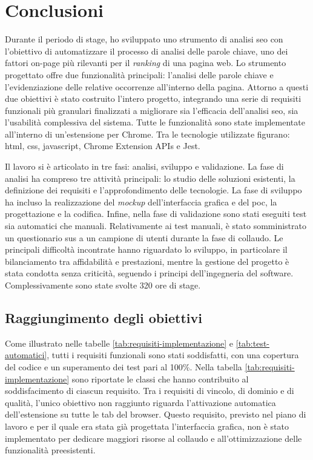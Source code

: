 \chapter{Conclusioni}
\label{cap:conclusioni}

\par Durante il periodo di stage, ho sviluppato uno strumento di analisi \gls{seo} con l’obiettivo di automatizzare il processo di analisi delle parole chiave, uno dei fattori \gls{on-page} più rilevanti per il \textit{ranking} di una pagina web. Lo strumento progettato offre due funzionalità principali: l’analisi delle parole chiave e l’evidenziazione delle relative occorrenze all’interno della pagina. Attorno a questi due obiettivi è stato costruito l’intero progetto, integrando una serie di requisiti funzionali più granulari finalizzati a migliorare sia l’efficacia dell’analisi \gls{seo}, sia l’usabilità complessiva del sistema. Tutte le funzionalità sono state implementate all’interno di un’estensione per Chrome. Tra le tecnologie utilizzate figurano: \gls{html}, \gls{css}, \gls{javascript}, Chrome Extension APIs e Jest.

\vspace{10pt}
\par\noindent Il lavoro si è articolato in tre fasi: analisi, sviluppo e validazione. La fase di analisi ha compreso tre attività principali: lo studio delle soluzioni esistenti, la definizione dei \gls{requisiti} e l’approfondimento delle tecnologie. La fase di sviluppo ha incluso la realizzazione del \textit{mockup} dell'interfaccia grafica e del \gls{poc}, la progettazione e la codifica. Infine, nella fase di validazione sono stati eseguiti test sia automatici che manuali. Relativamente ai test manuali, è stato somministrato un questionario \gls{sus} a un campione di utenti durante la fase di collaudo. Le principali difficoltà incontrate hanno riguardato lo sviluppo, in particolare il bilanciamento tra affidabilità e prestazioni, mentre la gestione del progetto è stata condotta senza criticità, seguendo i principi dell’ingegneria del software. Complessivamente sono state svolte 320 ore di stage.

\section{Raggiungimento degli obiettivi}

\par Come illustrato nelle tabelle \ref{tab:requisiti-implementazione} e \ref{tab:test-automatici}, tutti i \gls{requisiti} funzionali sono stati soddisfatti, con una copertura del codice e un superamento dei test pari al 100\%. Nella tabella \ref{tab:requisiti-implementazione} sono riportate le classi che hanno contribuito al soddisfacimento di ciascun requisito. Tra i \gls{requisiti} di vincolo, di dominio e di qualità, l’unico obiettivo non raggiunto riguarda l’attivazione automatica dell’estensione su tutte le tab del browser. Questo requisito, previsto nel piano di lavoro e per il quale era stata già progettata l’interfaccia grafica, non è stato implementato per dedicare maggiori risorse al collaudo e all’ottimizzazione delle funzionalità preesistenti.

